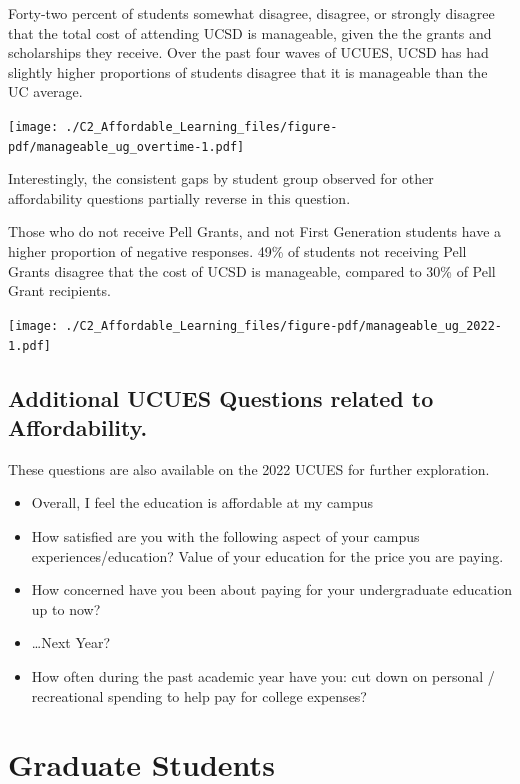 \documentclass[
  letterpaper,
  DIV=11,
  numbers=noendperiod]{scrreprt}
\providecommand{\tightlist}{%
  \setlength{\itemsep}{0pt}\setlength{\parskip}{0pt}}\usepackage{longtable,booktabs,array}
\begin{document}
Forty-two percent of students somewhat disagree, disagree, or strongly
disagree that the total cost of attending UCSD is manageable, given the
the grants and scholarships they receive. Over the past four waves of
UCUES, UCSD has had slightly higher proportions of students disagree
that it is manageable than the UC average.

\texttt{[image: ./C2\_Affordable\_Learning\_files/figure-pdf/manageable\_ug\_overtime-1.pdf]}

Interestingly, the consistent gaps by student group observed for other
affordability questions partially reverse in this question.

Those who do not receive Pell Grants, and not First Generation students
have a higher proportion of negative responses. 49\% of students not
receiving Pell Grants disagree that the cost of UCSD is manageable,
compared to 30\% of Pell Grant recipients.

\texttt{[image: ./C2\_Affordable\_Learning\_files/figure-pdf/manageable\_ug\_2022-1.pdf]}

\hypertarget{additional-ucues-questions-related-to-affordability.}{%
\subsection{Additional UCUES Questions related to
Affordability.}\label{additional-ucues-questions-related-to-affordability.}}

These questions are also available on the 2022 UCUES for further
exploration.

\begin{itemize}
\tightlist
\item
  Overall, I feel the education is affordable at my campus
\item
  How satisfied are you with the following aspect of your campus
  experiences/education? Value of your education for the price you are
  paying.
\item
  How concerned have you been about paying for your undergraduate
  education up to now?
\item
  \ldots Next Year?
\item
  How often during the past academic year have you: cut down on personal
  / recreational spending to help pay for college expenses?
\end{itemize}

\hypertarget{graduate-students-1}{%
\section{Graduate Students}\label{graduate-students-1}}
\end{document}
